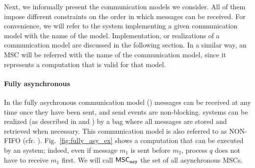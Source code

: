 
Next, we informally present the communication models we consider. All of them impose different constraints on the order in which messages can be received.
For convenience, we will refer to the system implementing a given communication model with the name of the model. Implementation, or realizations of a communication model are discussed in the following section.
In a similar way, an MSC will be referred with the name of the communication model, since it represents a computation that is valid for that model. 

%
\paragraph{\bf Fully asynchronous}
In the fully asychronous communication model (\asy) messages can be received at any time once they have been sent, and send events are non-blocking.
\asy systems can be realized (as described in \cite{DBLP:journals/fac/ChevrouHQ16} and \cite{DBLP:journals/tcs/BasuB16})  by a bag where all messages are stored and retrieved when necessary.
This communication model is also referred to as NON-FIFO (cfr.  \cite{DBLP:journals/dc/Charron-BostMT96}).
Fig.~\ref{fig:fully_asy_ex} shows a computation that can be executed by an \asy  system; indeed, even if message $m_1$ is sent before $m_2$, process $q$ does not have to receive $m_1$ first.   We will call $\mathsf{MSC}_{\mathtt{asy}}$ the set of all asynchronous MSCs.

